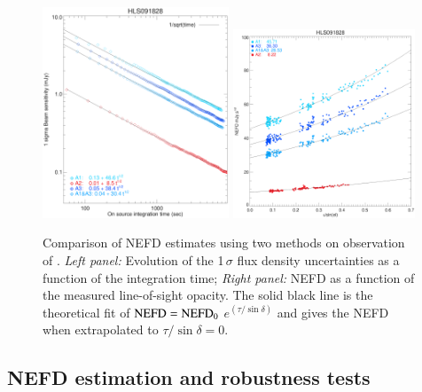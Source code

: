 \begin{figure}[!thbp]
  \begin{center}
    \includegraphics[trim={0.5cm, 0.5cm, 1.5cm, 1.8cm}, clip, angle=0, width=0.495\textwidth]{Figures/hls_nefd_vst.eps}
    \includegraphics[trim={0.5cm, 0, 0.2cm, 0.5cm}, clip, angle=0, width=0.485\textwidth]{Figures/hls_NEFD_vs_TauElev_all.eps}
    \caption{Comparison of NEFD estimates using two methods on
      observation of \hls. \emph{Left panel:} Evolution of the 1\,$\sigma$ flux density uncertainties as a function of the integration time; \emph{Right panel:} NEFD as a function of the measured line-of-sight opacity. The solid black line is the theoretical fit of $\rm{NEFD} = \rm{NEFD}_0$ $e^{(\tau/\sin\delta)}$ and gives the NEFD when extrapolated to $\tau/\sin\delta = 0$.}
    \label{fig:nefd_twomethods}
  \end{center}
\end{figure}

\subsection{NEFD estimation and robustness tests}
\label{se:nefd_results}

